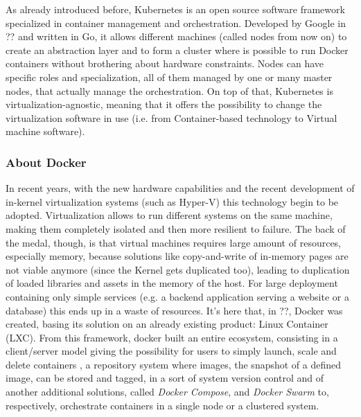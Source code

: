 \documentclass[10pt]{book}
\begin{document}
As already introduced before, Kubernetes is an open source software framework 
specialized in container management and orchestration. Developed by Google in 
?? and written in Go, it allows different 
machines (called nodes from now on) to create an abstraction layer and to form a 
cluster where is possible to run Docker containers without brothering about 
hardware constraints. Nodes can have specific roles and specialization, all of 
them managed by one or many master nodes, that actually manage the 
orchestration.
On top of that, Kubernetes is virtualization-agnostic, meaning that it offers 
the possibility to change the virtualization software in use (i.e. from 
Container-based technology to Virtual machine software).

\subsubsection{About Docker}

In recent years, with the new hardware capabilities and the recent development 
of in-kernel virtualization systems (such as Hyper-V) this technology 
begin to be adopted. Virtualization allows to run different systems on the 
same machine, making them completely isolated and then more resilient to 
failure. The back of the medal, though, is that virtual machines requires large 
amount of resources, especially memory, because solutions like copy-and-write 
of in-memory pages are not viable anymore (since the Kernel gets duplicated 
too), leading to duplication of loaded libraries and assets in the memory of the 
host. For large deployment containing only simple services (e.g. a backend 
application serving a website or a database) this ends up in a waste of 
resources.  It's here that, in ??, Docker was 
created, basing its solution on an already existing product: Linux Container 
(LXC). From this framework, docker built an entire ecosystem, consisting in a 
client/server model giving the possibility for users to simply launch, scale and 
delete containers , a repository system where 
images, the snapshot of a defined image, can be stored and tagged, in a sort of 
system version control and of another additional solutions, called 
\textit{Docker Compose}, and \textit{Docker Swarm} to, respectively, orchestrate 
containers in a single node or a clustered system. \vspace{0.5cm}
\end{document}

